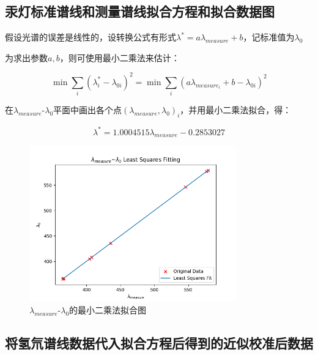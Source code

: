 \documentclass[a4paper,UTF8]{ctexart}
\begin{document}
\subsection{汞灯标准谱线和测量谱线拟合方程和拟合数据图}

假设光谱的误差是线性的，设转换公式有形式$\lambda^{*} = a \lambda_{measure} + b$，记标准值为$\lambda_{0}$

为求出参数$a,b$，则可使用最小二乘法来估计：

\begin{equation}
    \min{\sum_{i}{(\lambda^{*}_{i} - \lambda_{0i})^2}} = \min{\sum_{i}{(a \lambda_{measure_{i}} + b - \lambda_{0i})^2}}
\end{equation}

在$\lambda_{measure}$-$\lambda_{0}$平面中画出各个点$(\lambda_{measure},\lambda_{0})_{i}$，并用最小二乘法拟合，得：

\begin{equation}
    \lambda^{*} = 1.0004515 \lambda_{measure} - 0.2853027
\end{equation}

\begin{figure}[H]
    \centering
    \begin{minipage}[b]{0.9\textwidth}
        \centering
        \includegraphics[width=0.8\textwidth]{./hr_fit.png}
        \caption{$\lambda_{measure}$-$\lambda_{0}$的最小二乘法拟合图}
    \end{minipage}
\end{figure}

\subsection{将氢氘谱线数据代入拟合方程后得到的近似校准后数据}
\end{document}
